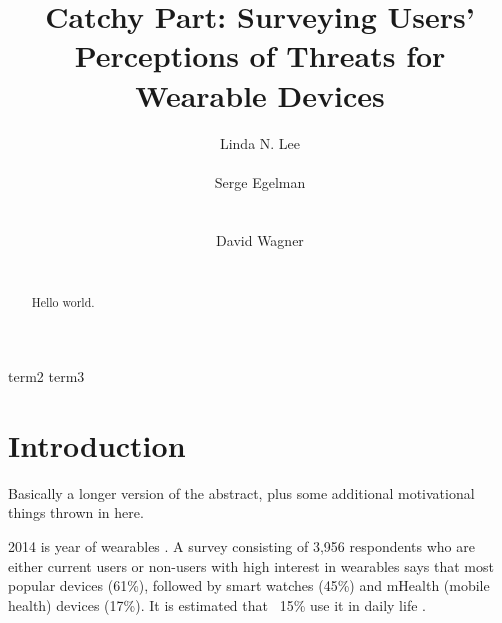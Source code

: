 \documentclass{acm_proc_article-sp}
\begin{document}
\title{Catchy Part: Surveying Users' Perceptions of Threats for Wearable Devices}




\author{
\alignauthor
Linda N. Lee\\
       \\
\alignauthor
Serge Egelman\\
       \\
       \\
\alignauthor David Wagner\\
       \\
}

\maketitle



\begin{abstract}
Hello world.
\end{abstract}


 {term2} {term3}



\section{Introduction}
Basically a longer version of the abstract, plus some additional motivational things thrown in here. 

2014 is year of wearables \cite{Forbes}. A survey consisting of 3,956 respondents who are either current users or non-users with high interest in wearables \cite{Neilsen} says that most popular devices (61\%), followed by smart watches (45\%) and mHealth (mobile health) devices (17\%). It is estimated that ~15\% use it in daily life \cite{Nilsen}\cite{WearableStatNews}.
\end{document}
